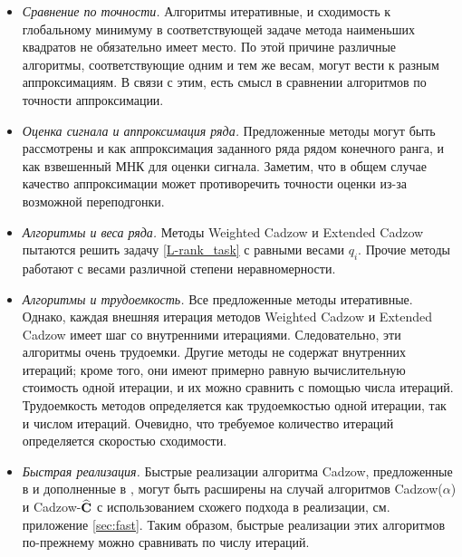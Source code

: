 \documentclass[12pt, specialist, subf,href,colorlinks=true,substylefile = spbu.rtx]{disser}
\theoremstyle{remark}
\theoremstyle{definition}
\begin{document}
\begin{itemize}
	\item \textit{Сравнение по точности.}
	Алгоритмы итеративные, и сходимость к глобальному минимуму в соответствующей задаче метода наименьших квадратов не обязательно имеет место. По этой причине различные алгоритмы, соответствующие одним и тем же весам, могут вести к разным аппроксимациям. В связи с этим, есть смысл в сравнении алгоритмов по точности аппроксимации.	
	\item \textit{Оценка сигнала и аппроксимация ряда.}
	Предложенные методы могут быть рассмотрены и как аппроксимация заданного ряда рядом конечного ранга, и как взвешенный МНК для оценки сигнала. Заметим, что в общем случае качество аппроксимации может противоречить точности оценки из-за возможной переподгонки.
	\item \textit{Алгоритмы и веса ряда.}
	Методы Weighted Cadzow и Extended Cadzow пытаются решить задачу \eqref{L-rank_task} с равными весами $q_i$. Прочие методы работают с весами различной степени неравномерности.
	\item \textit{Алгоритмы и трудоемкость.}
	Все предложенные методы итеративные. Однако, каждая внешняя итерация методов Weighted Cadzow и Extended Cadzow имеет шаг со внутренними итерациями. Следовательно, эти алгоритмы очень трудоемки. Другие методы не содержат внутренних итераций; кроме того, они имеют примерно равную вычислительную стоимость одной итерации, и их можно сравнить с помощью числа итераций.
	Трудоемкость методов определяется как трудоемкостью одной итерации, так и числом итераций. Очевидно, что требуемое количество итераций определяется скоростью сходимости.
	\item \textit{Быстрая реализация.}
	Быстрые реализации алгоритма Cadzow, предложенные в \cite{Korobeynikov2010} и дополненные в \cite{Golyandina.etal2015}, могут быть расширены на случай алгоритмов Cadzow($\alpha$) и Cadzow-$\widehat{\mathbf{C}}$ с использованием схожего подхода в реализации, см. приложение \ref{sec:fast}. Таким образом, быстрые реализации этих алгоритмов по-прежнему можно сравнивать по числу итераций.
	

\end{itemize}
\end{document}
